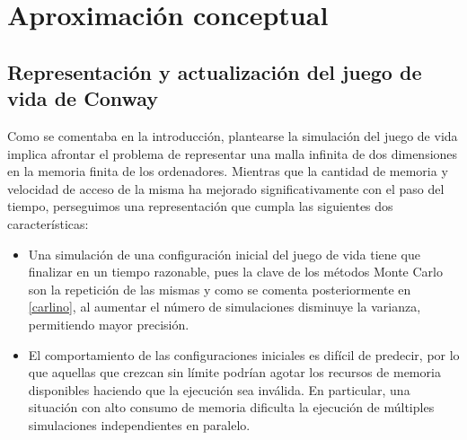 \documentclass[../proyecto.tex]{memoir}
\begin{document}
\chapter{Aproximación conceptual}

\section{Representación y actualización del juego de vida de Conway}


Como se comentaba en la introducción, plantearse la simulación del juego de vida implica afrontar el problema de representar una malla infinita de dos dimensiones en la memoria finita de los ordenadores. Mientras que la cantidad de memoria y velocidad de acceso de la misma ha mejorado significativamente con el paso del tiempo, perseguimos una representación que cumpla las siguientes dos características:

\begin{itemize}
\item Una simulación de una configuración inicial del juego de vida tiene que finalizar en un tiempo razonable, pues la clave de los métodos Monte Carlo son la repetición de las mismas y como se comenta posteriormente en \ref{carlino}, al aumentar el número de simulaciones disminuye la varianza, permitiendo mayor precisión.

\item El comportamiento de las configuraciones iniciales es difícil de predecir, por lo que aquellas que crezcan sin límite podrían agotar los recursos de memoria disponibles haciendo que la ejecución sea inválida. En particular, una situación con alto consumo de memoria dificulta la ejecución de múltiples simulaciones independientes en paralelo.
\end{itemize}
\end{document}
